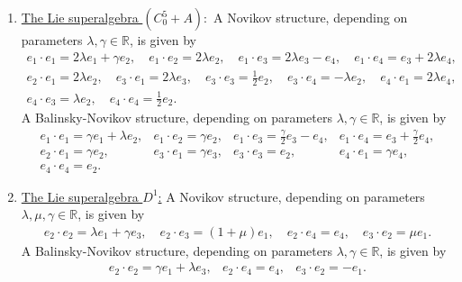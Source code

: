 \documentclass[12pt]{amsart}
\begin{document}
\begin{enumerate}
\[    \]
A Balinsky-Novikov structure, depending on parameters $\lambda, \gamma \in \mathbb R$, is given by
 \[
 \begin{array}{llll}
e_1 \cdot e_1= \gamma e_1 + \lambda e_2, & e_1 \cdot e_2= \gamma e_2, & 
e_1 \cdot e_3=\frac{\gamma}{2}e_3,&
e_1 \cdot e_4=e_3+\frac{\gamma}{2} e_4,\\[2mm]
e_2\cdot e_1= \gamma e_2, & e_3\cdot e_1=\gamma e_3, & e_4\cdot e_1=\gamma e_4, & e_4\cdot e_4=e_2.
 \end{array}
 \]
      \item \underline{The Lie superalgebra $(C_{0}^5+A):$} A  Novikov structure, depending on parameters $\lambda, \gamma \in \mathbb R$, is given by
    \[
\begin{array}{l}
e_1\cdot e_1= 2\lambda e_1 +\gamma e_2 , \quad e_1\cdot e_2= 2\lambda e_2, \quad e_1\cdot e_3= 2 \lambda  e_3 -e_4, \quad e_1\cdot e_4=e_3+ 2\lambda e_4,\\[2mm]
e_2\cdot e_1=2\lambda e_2, \quad e_3\cdot e_1=2 \lambda e_3, \quad e_3 \cdot e_3=\frac{1}{2} e_2, \quad e_3\cdot e_4=-\lambda e_2, \quad e_4\cdot e_1=2 \lambda e_4, \\[2mm] 
e_4\cdot e_3=\lambda e_2, \quad e_4\cdot e_4=\frac{1}{2}e_2.
\end{array}
 \]
A Balinsky-Novikov structure, depending on parameters $\lambda, \gamma \in \mathbb R$, is given by
 \[
 \begin{array}{llll}
e_1 \cdot e_1= \gamma e_1 + \lambda e_2, & e_1 \cdot e_2= \gamma e_2, & 
e_1 \cdot e_3=\frac{\gamma}{2}e_3-e_4,&
e_1 \cdot e_4=e_3+\frac{\gamma}{2} e_4,\\[2mm]
e_2\cdot e_1= \gamma e_2, & e_3\cdot e_1=\gamma e_3, & e_3\cdot e_3= e_2, & e_4\cdot e_1=\gamma e_4,\\[2mm]
e_4\cdot e_4=e_2.
 \end{array}
 \]
    \item \underline{The Lie superalgebra $D^1$:} A Novikov structure, depending on parameters $\lambda,\mu,  \gamma \in \mathbb R$, is given by
    \[
\begin{array}{l}
e_2\cdot e_2= \lambda e_1 +\gamma e_3 , \quad e_2\cdot e_3= (1+\mu) e_1, \quad e_2\cdot e_4=e_4, \quad e_3\cdot e_2= \mu e_1.
\end{array}
 \]
A Balinsky-Novikov structure, depending on parameters $\lambda, \gamma \in \mathbb R$, is given by
 \[
 \begin{array}{llll}
e_2 \cdot e_2= \gamma e_1 + \lambda e_3, & e_2 \cdot e_4=  e_4, & 
e_3 \cdot e_2=-e_1.
 \end{array}
\]
\end{enumerate}
\end{document}
